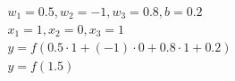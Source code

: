 \documentclass[preview]{standalone}
\begin{document}
\begin{align*}
w_1 = 0.5, w_2 = -1, w_3 = 0.8, b = 0.2\\ x_1 = 1, x_2 = 0, x_3 = 1\\ y = f(0.5\cdot1 + (-1)\cdot0 + 0.8\cdot1 + 0.2)\\ y = f(1.5)
\end{align*}
\end{document}
